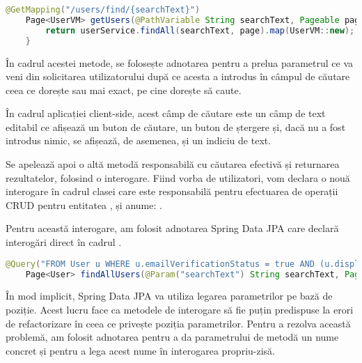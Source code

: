 \begin{lstlisting}[language=Java]
	@GetMapping("/users/find/{searchText}")
	Page<UserVM> getUsers(@PathVariable String searchText, Pageable page) {
		return userService.findAll(searchText, page).map(UserVM::new);
	}
\end{lstlisting}
\bigskip

În cadrul acestei metode, se folosește adnotarea  pentru a prelua parametrul ce va veni din solicitarea utilizatorului după ce acesta a introdus în câmpul de căutare ceea ce dorește sau mai exact, pe cine dorește să caute.\newline

În cadrul aplicației client-side, acest câmp de căutare este un câmp de text editabil ce afișează un buton de căutare, un buton de ștergere și, dacă nu a fost introdus nimic, se afișează, de asemenea, și un indiciu de text.\newline

Se apelează apoi o altă metodă responsabilă cu căutarea efectivă și returnarea rezultatelor, folosind o interogare. Fiind vorba de utilizatori, vom declara o nouă interogare în cadrul clasei care este responsabilă pentru efectuarea de operații CRUD pentru entitatea , și anume: .\newline

Pentru această interogare, am folosit adnotarea Spring Data JPA \cite{.springjpabook} care declară interogări direct în cadrul .\newline

\begin{lstlisting}[language=Java]
	@Query("FROM User u WHERE u.emailVerificationStatus = true AND (u.displayName LIKE %:searchText% OR u.username LIKE %:searchText%) ORDER BY u.username, u.displayName ASC")
	Page<User> findAllUsers(@Param("searchText") String searchText, Pageable page);
\end{lstlisting}
\bigskip

În mod implicit, Spring Data JPA va utiliza legarea parametrilor pe bază de poziție. Acest lucru face ca metodele de interogare să fie puțin predispuse la erori de refactorizare în ceea ce privește poziția parametrilor. Pentru a rezolva această problemă, am folosit adnotarea  pentru a da parametrului de metodă  un nume concret și pentru a lega acest nume în interogarea propriu-zisă.\newline

